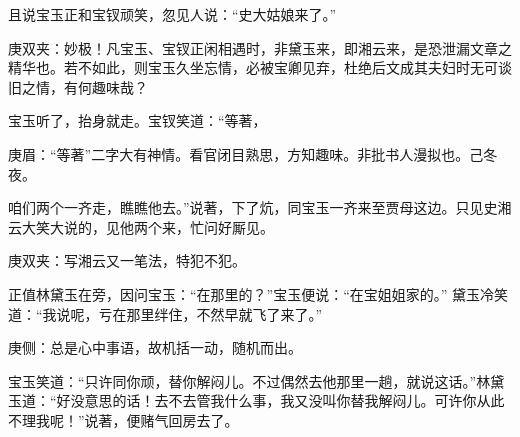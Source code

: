 \begin{parag}
    且说宝玉正和宝钗顽笑，忽见人说：“史大姑娘来了。”\begin{note}庚双夹：妙极！凡宝玉、宝钗正闲相遇时，非黛玉来，即湘云来，是恐泄漏文章之精华也。若不如此，则宝玉久坐忘情，必被宝卿见弃，杜绝后文成其夫妇时无可谈旧之情，有何趣味哉？\end{note}宝玉听了，抬身就走。宝钗笑道：“等著，\begin{note}庚眉：“等著”二字大有神情。看官闭目熟思，方知趣味。非批书人漫拟也。己冬夜。\end{note}咱们两个一齐走，瞧瞧他去。”说著，下了炕，同宝玉一齐来至贾母这边。只见史湘云大笑大说的，见他两个来，忙问好厮见。\begin{note}庚双夹：写湘云又一笔法，特犯不犯。\end{note}正值林黛玉在旁，因问宝玉：“在那里的？”宝玉便说：“在宝姐姐家的。” 黛玉冷笑道：“我说呢，亏在那里绊住，不然早就飞了来了。”\begin{note}庚侧：总是心中事语，故机括一动，随机而出。\end{note}宝玉笑道：“只许同你顽，替你解闷儿。不过偶然去他那里一趟，就说这话。”林黛玉道：“好没意思的话！去不去管我什么事，我又没叫你替我解闷儿。可许你从此不理我呢！”说著，便赌气回房去了。
\end{parag}


